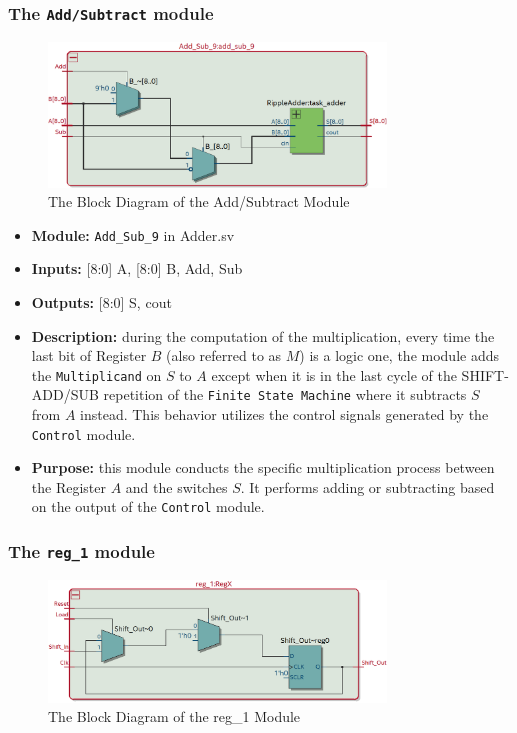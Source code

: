 \documentclass{article}
\begin{document}
\subsubsection{The \texttt{Add/Subtract} module}
\begin{figure}[h]
    \centering
    \includegraphics[width=0.8\textwidth]{add_sub.png}
    \caption{The Block Diagram of the Add/Subtract Module}
    \label{fig:add_sub}
\end{figure}

\begin{itemize}
    \item \textbf{Module:} \texttt{Add\_Sub\_9} in Adder.sv
    \item \textbf{Inputs:} [8:0] A, [8:0] B, Add, Sub
    \item \textbf{Outputs:} [8:0] S, cout
    \item \textbf{Description:} during the computation of the multiplication, every time the last bit of Register $B$ (also referred to as $M$) is a logic one, the module adds the \texttt{Multiplicand} on $S$ to $A$ except when it is in the last cycle of the SHIFT-ADD/SUB repetition of the \texttt{Finite State Machine} where it subtracts $S$ from $A$ instead. This behavior utilizes the control signals generated by the \texttt{Control} module.
    \item \textbf{Purpose:} this module conducts the specific multiplication process between the Register $A$ and the switches $S$. It performs adding or subtracting based on the output of the \texttt{Control} module. 
\end{itemize}

\clearpage


\subsubsection{The \texttt{reg\_1} module}
\begin{figure}[h]
    \centering
    \includegraphics[width=0.8\textwidth]{reg_1.png}
    \caption{The Block Diagram of the reg\_1 Module}
    \label{fig:reg_1}
\end{figure}
\end{document}
